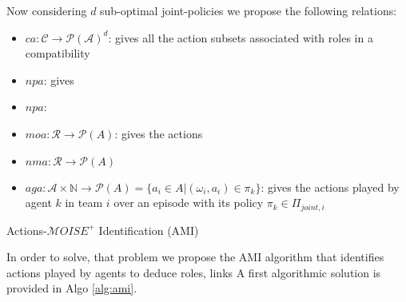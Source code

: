 \documentclass[runningheads]{llncs}
\begin{document}
Now considering $d$ sub-optimal joint-policies we propose the following relations:

\begin{itemize}
    \item $ca: \mathcal{C} \rightarrow \mathcal{P(A)}^d$: gives all the action subsets associated with roles in a compatibility
    \item $npa$: gives
    \item $npa$:
    \item $moa: \mathcal{R} \rightarrow \mathcal{P}(A)$: gives the actions
    \item $nma: \mathcal{R} \rightarrow \mathcal{P}(A)$
    \item $aga: \mathcal{A} \times \mathbb{N} \rightarrow \mathcal{P}(A) = \{a_i \in A | (\omega_i, a_i) \in \pi_k\}$: gives the actions played by agent $k$ in team $i$ over an episode with its policy $\pi_k \in \Pi_{joint, i}$
\end{itemize}



\begin{algorithm}[hbt!]
    \caption{Actions-$\mathcal{M}OISE^+$ Identification (AMI)}\label{alg:ami}
    
    
    
    
    
\end{algorithm}


In order to solve, that problem we propose the AMI algorithm that identifies actions played by agents to deduce roles, links 
A first algorithmic solution is provided in Algo \ref{alg:ami}.
\end{document}
